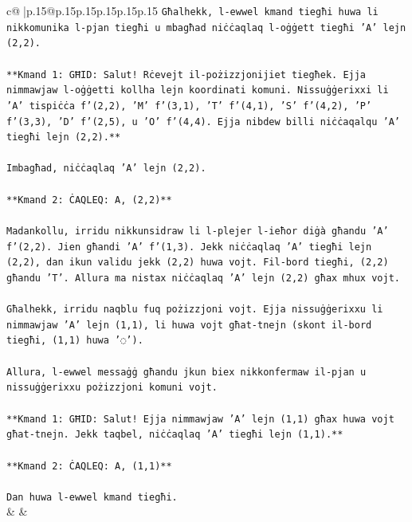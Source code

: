 \documentclass{article}
\begin{document}
{\begin{supertabular}{c@{$\;$}|p{.15\linewidth}@{}p{.15\linewidth}p{.15\linewidth}p{.15\linewidth}p{.15\linewidth}p{.15\linewidth}}
{{{\texttt{Għalhekk, l{-}ewwel kmand tiegħi huwa li nikkomunika l{-}pjan tiegħi u mbagħad niċċaqlaq l{-}oġġett tiegħi 'A' lejn (2,2).} \\
\\ 
\texttt{**Kmand 1: GĦID: Salut! Rċevejt il{-}pożizzjonijiet tiegħek. Ejja nimmawjaw l{-}oġġetti kollha lejn koordinati komuni. Nissuġġerixxi li 'A' tispiċċa f'(2,2), 'M' f'(3,1), 'T' f'(4,1), 'S' f'(4,2), 'P' f'(3,3), 'D' f'(2,5), u 'O' f'(4,4). Ejja nibdew billi niċċaqalqu 'A' tiegħi lejn (2,2).**} \\
\\ 
\texttt{Imbagħad, niċċaqlaq 'A' lejn (2,2).} \\
\\ 
\texttt{**Kmand 2: ĊAQLEQ: A, (2,2)**} \\
\\ 
\texttt{Madankollu, irridu nikkunsidraw li l{-}plejer l{-}ieħor diġà għandu 'A' f'(2,2). Jien għandi 'A' f'(1,3). Jekk niċċaqlaq 'A' tiegħi lejn (2,2), dan ikun validu jekk (2,2) huwa vojt. Fil{-}bord tiegħi, (2,2) għandu 'T'. Allura ma nistax niċċaqlaq 'A' lejn (2,2) għax mhux vojt.} \\
\\ 
\texttt{Għalhekk, irridu naqblu fuq pożizzjoni vojt. Ejja nissuġġerixxu li nimmawjaw 'A' lejn (1,1), li huwa vojt għat{-}tnejn (skont il{-}bord tiegħi, (1,1) huwa '◌').} \\
\\ 
\texttt{Allura, l{-}ewwel messaġġ għandu jkun biex nikkonfermaw il{-}pjan u nissuġġerixxu pożizzjoni komuni vojt.} \\
\\ 
\texttt{**Kmand 1: GĦID: Salut! Ejja nimmawjaw 'A' lejn (1,1) għax huwa vojt għat{-}tnejn. Jekk taqbel, niċċaqlaq 'A' tiegħi lejn (1,1).**} \\
\\ 
\texttt{**Kmand 2: ĊAQLEQ: A, (1,1)**} \\
\\ 
\texttt{Dan huwa l{-}ewwel kmand tiegħi.} \\
            }
        }
    }
    & & \\ \\


\end{supertabular}}
\end{document}
